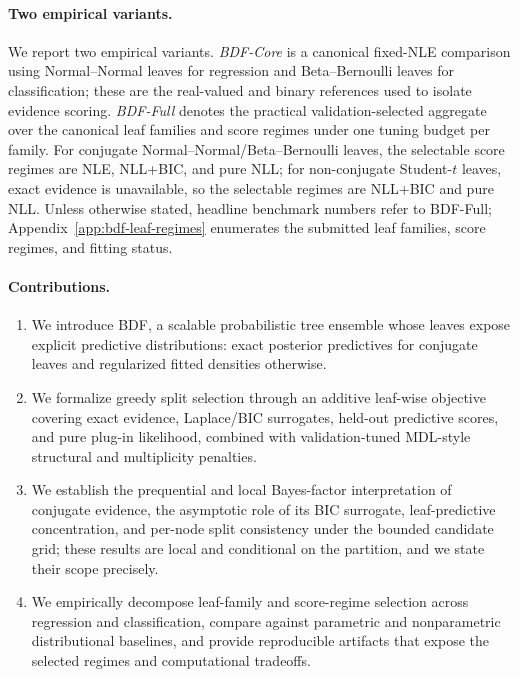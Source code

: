 \documentclass[10pt]{article} %
\begin{document}
\paragraph{Two empirical variants.}
We report two empirical variants. \emph{BDF-Core} is a canonical fixed-NLE comparison using Normal--Normal leaves for regression and Beta--Bernoulli leaves for classification; these are the real-valued and binary references used to isolate evidence scoring.
\emph{BDF-Full} denotes the practical validation-selected aggregate over the canonical leaf families and score regimes under one tuning budget per family.
For conjugate Normal--Normal/Beta--Bernoulli leaves, the selectable score regimes are NLE, NLL+BIC, and pure NLL; for non-conjugate Student-$t$ leaves, exact evidence is unavailable, so the selectable regimes are NLL+BIC and pure NLL.
Unless otherwise stated, headline benchmark numbers refer to BDF-Full; Appendix~\ref{app:bdf-leaf-regimes} enumerates the submitted leaf families, score regimes, and fitting status.

\paragraph{Contributions.}
\begin{enumerate}
\item We introduce BDF, a scalable probabilistic tree ensemble whose leaves expose explicit predictive distributions: exact posterior predictives for conjugate leaves and regularized fitted densities otherwise.
\item We formalize greedy split selection through an additive leaf-wise objective covering exact evidence, Laplace/BIC surrogates, held-out predictive scores, and pure plug-in likelihood, combined with validation-tuned MDL-style structural and multiplicity penalties.
\item We establish the prequential and local Bayes-factor interpretation of conjugate evidence, the asymptotic role of its BIC surrogate, leaf-predictive concentration, and per-node split consistency under the bounded candidate grid; these results are local and conditional on the partition, and we state their scope precisely.
\item We empirically decompose leaf-family and score-regime selection across regression and classification, compare against parametric and nonparametric distributional baselines, and provide reproducible artifacts that expose the selected regimes and computational tradeoffs.
\end{enumerate}
\end{document}
